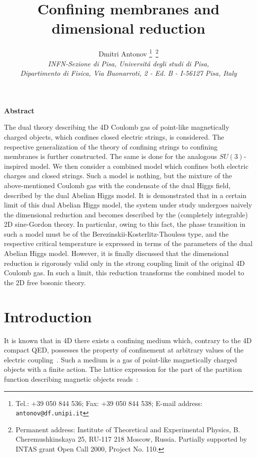 \documentclass[a4paper,12pt]{article}
\title{\bf Confining membranes and dimensional reduction}
\author{Dmitri Antonov \thanks{Tel.: +39 050 844 536; Fax: +39 050 844 538; E-mail address: {\tt antonov@df.unipi.it}}{\,}
\thanks{Permanent address:
Institute of Theoretical and Experimental Physics, 
B. Cheremushkinskaya 25, RU-117 218 Moscow, Russia. Partially supported by INTAS grant Open Call 2000, Project No. 110.}
\\
{\it INFN-Sezione di Pisa, Universit\'a degli studi di Pisa,}\\
{\it Dipartimento di Fisica, Via Buonarroti, 2 - Ed. B - I-56127 Pisa, Italy}}
\date{}
\begin{document}
\maketitle
\vspace{1mm}
\centerline{\bf {Abstract}}
\vspace{3mm}
\noindent
The dual theory describing the 4D Coulomb gas of point-like magnetically charged objects, 
which confines closed electric strings, is considered. The respective generalization of the 
theory of confining strings to confining membranes is further constructed. The same is done for the 
analogous $SU(3)$-inspired model. We then consider a combined 
model which confines both electric charges and closed strings. Such a model is nothing, but 
the mixture of the above-mentioned Coulomb gas with the condensate of the dual Higgs field, described 
by the dual Abelian Higgs model. 
It is demonstrated that in a certain limit of this dual Abelian Higgs model, 
the system under study undergoes naively the dimensional
reduction and becomes described by the (completely integrable) 2D sine-Gordon theory. In particular,
owing to this fact, the phase transition in such a model must be of the Berezinskii-Kosterlitz-Thouless
type, and the respective critical temperature is expressed in terms of the parameters of the 
dual Abelian Higgs model. However, it is finally discussed that the dimensional reduction is 
rigorously valid only in the strong coupling limit of the original 4D Coulomb gas. In such a limit, this reduction 
transforms the combined model to the 2D free bosonic theory.





\newpage

\section{Introduction}

It is known that in 4D there exists a confining medium which, 
contrary to the 4D compact QED, possesses the property of confinement 
at arbitrary values of the electric coupling~\cite{1}. Such a medium is a gas of 
point-like magnetically charged objects with a finite action. The lattice expression 
for the part of the partition function describing magnetic objects reads~\cite{1}:
\end{document}
